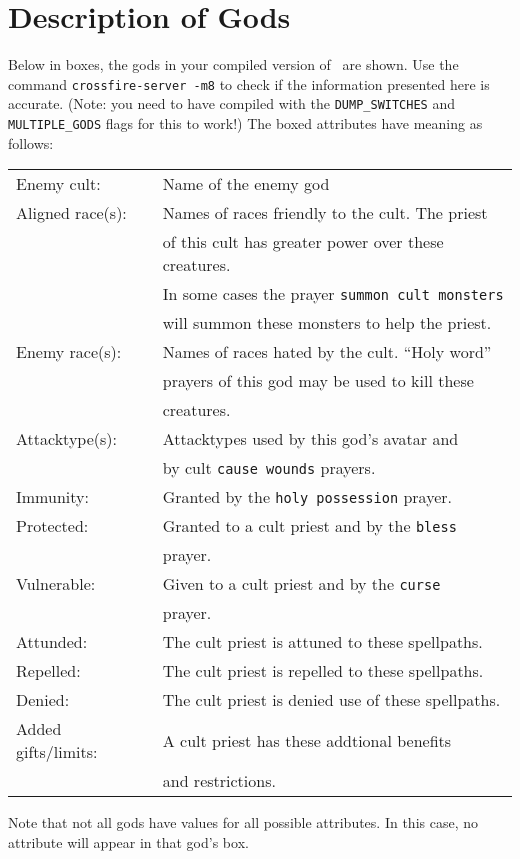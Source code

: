 \chapter{Description of Gods}
\label{app:gods}

Below in boxes, the gods in your compiled version of \cf\ are shown.
Use the command {\tt crossfire-server -m8} to check if the information
presented here is accurate.
(Note: you need to have compiled with the {\tt DUMP\_SWITCHES} and
{\tt MULTIPLE\_GODS} flags for this to work!) The boxed attributes
have meaning as follows:
\vskip 12pt
\begin{tabular}{ll}
Enemy cult: & Name of the enemy god \\
Aligned race(s): & Names of races friendly to the cult. The priest \\
	 & of this cult has greater power over these creatures. \\
	 & In some cases the prayer {\tt summon cult monsters} \\
	 & will summon these monsters to help the priest. \\
Enemy race(s): & Names of races hated by the cult. ``Holy word'' \\
	 & prayers of this god may be used to kill these \\
	 & creatures. \\
Attacktype(s): & Attacktypes used by this god's avatar and \\
	 & by cult {\tt cause wounds} prayers. \\
Immunity: & Granted by the {\tt holy possession} prayer. \\
Protected: & Granted to a cult priest and by the {\tt bless} \\
	 & prayer. \\
Vulnerable: & Given to a cult priest and by the {\tt curse } \\
	 & prayer. \\
Attunded: & The cult priest is attuned to these spellpaths. \\
Repelled: & The cult priest is repelled to these spellpaths. \\
Denied: & The cult priest is denied use of these spellpaths. \\
Added gifts/limits: & A cult priest has these addtional benefits\\
 	& and restrictions. \\
\end{tabular}
\vskip 12pt
Note that not all gods have values for all possible attributes. In
this case, no attribute will appear in that god's box.

\begin{longtable}{|p{4cm}p{9cm}|} \hline

\end{longtable}

